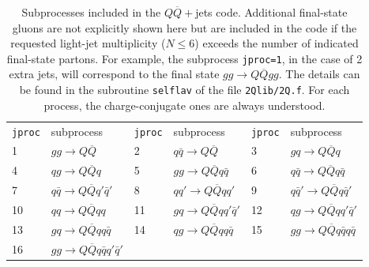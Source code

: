 \documentclass[paper]{JHEP3}
\newcommand{\ccaption}[2]{
    \begin{center}
    \parbox{0.85\textwidth}{
      \caption[#1]{\small{{#2}}}
      }
    \end{center}
    }
\def    \qbar   {\bar{q}}
\def    \Qbar   {\overline{Q}}
\begin{document}
\begin{table}
\begin{center}
\begin{tabular}{ll|ll|ll}
{\tt jproc} & subprocess & {\tt jproc} & subprocess & {\tt jproc} &
subprocess \\ 
1 &  $g g \to  Q\Qbar$ 
&2 &  $q \qbar \to Q\Qbar$ 
&3 &  $g q \to  Q\Qbar q$ 
\\
4 &  $ q g \to Q\Qbar q$ 
&5 &  $g g  \to  Q \Qbar q \qbar$ 
&6 &  $q \qbar  \to Q \Qbar q \qbar$ 
\\
7 &  $q \qbar \to Q \Qbar q' \qbar'$ 
&8 &  $q q' \to Q \Qbar q q'$ 
&9 &  $q\qbar' \to  Q \Qbar q \qbar'$ 
\\
10 &  $q q\to Q \Qbar q q$ 
&11 &  $g q \to Q \Qbar q q'\qbar'$ 
&12 &  $q g  \to  Q \Qbar q q' \qbar'$ 
\\
13 &  $g q \to  Q \Qbar q q \qbar$ 
&14 &  $q g \to Q \Qbar q q \qbar $ 
&15 &  $g g \to  Q \Qbar q \qbar q \qbar$ 
\\
16 &  $g g \to  Q \Qbar q \qbar q' \qbar'$ 
& &  
& &
\end{tabular}
\ccaption{}{\label{tab:2Q} Subprocesses included in the $Q\Qbar+$jets
  code. Additional final-state gluons are not explicitly 
  shown here but are included in the code if the requested light-jet
  multiplicity ($N\le 6$) exceeds the number of indicated final-state partons.
  For example, the subprocess {\tt jproc=1},
  in the case of 2 extra jets, will correspond to the final state  
  $gg\to Q\Qbar g g$.
  The details can be found in the subroutine {\tt selflav} of
  the file {\tt 2Qlib/2Q.f}. For each process, the charge-conjugate 
  ones are always understood.}
\end{center}
\end{table}
\end{document}
